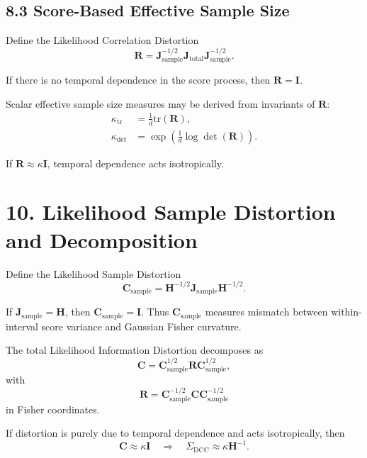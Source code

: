 \documentclass[11pt]{article}
\begin{document}
\subsection*{8.3 Score-Based Effective Sample Size}

Define the Likelihood Correlation Distortion
\begin{equation}
\mathbf R
=
\mathbf J_{\mathrm{sample}}^{-1/2}
\mathbf J_{\mathrm{total}}
\mathbf J_{\mathrm{sample}}^{-1/2}.
\end{equation}

If there is no temporal dependence in the score process, then $\mathbf R = \mathbf I$.

Scalar effective sample size measures may be derived from invariants of $\mathbf R$:
\begin{align}
\kappa_{\mathrm{tr}} &= \frac{1}{d}\mathrm{tr}(\mathbf R), \\
\kappa_{\mathrm{det}} &= \exp\!\left(\frac{1}{d}\log\det(\mathbf R)\right).
\end{align}

If $\mathbf R \approx \kappa \mathbf I$, temporal dependence acts isotropically.

\section*{10. Likelihood Sample Distortion and Decomposition}

Define the Likelihood Sample Distortion
\begin{equation}
\mathbf C_{\mathrm{sample}}
=
\mathbf H^{-1/2}
\mathbf J_{\mathrm{sample}}
\mathbf H^{-1/2}.
\end{equation}

If $\mathbf J_{\mathrm{sample}} = \mathbf H$, then $\mathbf C_{\mathrm{sample}} = \mathbf I$.
Thus $\mathbf C_{\mathrm{sample}}$ measures mismatch between within-interval score variance and Gaussian Fisher curvature.

The total Likelihood Information Distortion decomposes as
\begin{equation}
\mathbf C
=
\mathbf C_{\mathrm{sample}}^{1/2}
\mathbf R
\mathbf C_{\mathrm{sample}}^{1/2},
\end{equation}
with
\begin{equation}
\mathbf R
=
\mathbf C_{\mathrm{sample}}^{-1/2}
\mathbf C
\mathbf C_{\mathrm{sample}}^{-1/2}
\end{equation}
in Fisher coordinates.

If distortion is purely due to temporal dependence and acts isotropically, then
\begin{equation}
\mathbf C \approx \kappa \mathbf I
\quad \Rightarrow \quad
\Sigma_{\mathrm{DCC}} \approx \kappa \mathbf H^{-1}.
\end{equation}
\end{document}
